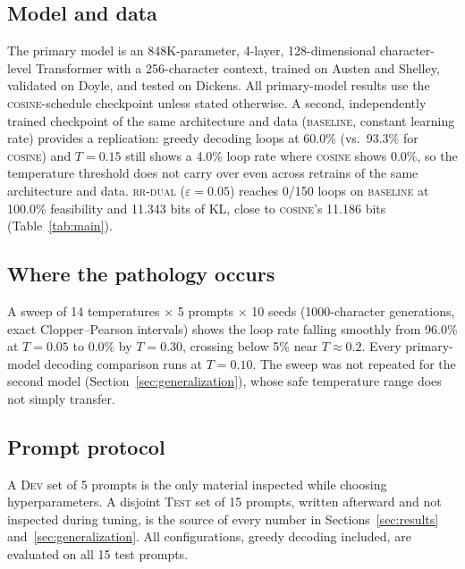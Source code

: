 \documentclass[11pt]{article}
\begin{document}
\subsection{Model and data}
The primary model is an 848K-parameter, 4-layer, 128-dimensional character-level Transformer with a 256-character context, trained on Austen and Shelley, validated on Doyle, and tested on Dickens. All primary-model results use the \textsc{cosine}-schedule checkpoint unless stated otherwise. A second, independently trained checkpoint of the same architecture and data (\textsc{baseline}, constant learning rate) provides a replication: greedy decoding loops at 60.0\% (vs.\ 93.3\% for \textsc{cosine}) and $T{=}0.15$ still shows a 4.0\% loop rate where \textsc{cosine} shows 0.0\%, so the temperature threshold does not carry over even across retrains of the same architecture and data. \textsc{rr-dual} ($\varepsilon{=}0.05$) reaches 0/150 loops on \textsc{baseline} at 100.0\% feasibility and 11.343 bits of KL, close to \textsc{cosine}'s 11.186 bits (Table~\ref{tab:main}).

\subsection{Where the pathology occurs}
A sweep of 14 temperatures $\times$ 5 prompts $\times$ 10 seeds (1000-character generations, exact Clopper--Pearson intervals) shows the loop rate falling smoothly from 96.0\% at $T{=}0.05$ to 0.0\% by $T{=}0.30$, crossing below 5\% near $T{\approx}0.2$. Every primary-model decoding comparison runs at $T{=}0.10$. The sweep was not repeated for the second model (Section~\ref{sec:generalization}), whose safe temperature range does not simply transfer.

\subsection{Prompt protocol}
A \textsc{Dev} set of 5 prompts is the only material inspected while choosing hyperparameters. A disjoint \textsc{Test} set of 15 prompts, written afterward and not inspected during tuning, is the source of every number in Sections~\ref{sec:results} and~\ref{sec:generalization}. All configurations, greedy decoding included, are evaluated on all 15 test prompts.
\end{document}
